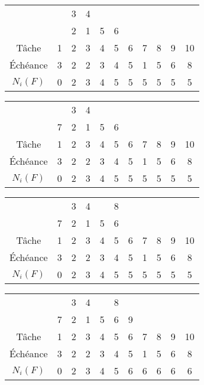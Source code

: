 \documentclass[11pt]{article}
\begin{document}
\begin{center}
\begin{tabular}{ |c| c c c c c c c c  c c |}
 \hline 
&  & 3 & {\color{magenta}4} & & & & & & & \\   
 & & 2 & 1 & 5 & 6& & & & & \\ 
Tâche & 1 & 2 & 3 & 4  & 5 & 6 & 7 & 8 & 9 & 10 \\ 
 \hline 
Échéance & 3 & 2 & 2 & 3  & 4 & 5 & 1 & 5 & 6 & 8  \\
 \hline
 $N_{i}(F)$ & 0 & 2 & 3 & 4 & 5 & 5 & 5 & 5 & 5 & 5 \\
 
  \hline 
\end{tabular}
\end{center}

\begin{center}
\begin{tabular}{ |c| c c c c c c c c  c c |}
 \hline 
&  & 3 & {\color{magenta}4} & & & & & & & \\   
 & {\color{magenta}7}& 2 & 1 & 5 & 6& & & & & \\ 
Tâche & 1 & 2 & 3 & 4  & 5 & 6 & 7 & 8 & 9 & 10 \\ 
 \hline 
Échéance & 3 & 2 & 2 & 3  & 4 & 5 & 1 & 5 & 6 & 8  \\
 \hline
 $N_{i}(F)$ & 0 & 2 & 3 & 4 & 5 & 5 & 5 & 5 & 5 & 5 \\
 
  \hline 
\end{tabular}
\end{center}

\begin{center}
\begin{tabular}{ |c| c c c c c c c c  c c |}
 \hline 
&  & 3 & {\color{magenta}4} & & {\color{magenta}8} & & & & & \\   
 & {\color{magenta}7}& 2 & 1 & 5 & 6& & & & & \\ 
Tâche & 1 & 2 & 3 & 4  & 5 & 6 & 7 & 8 & 9 & 10 \\ 
 \hline 
Échéance & 3 & 2 & 2 & 3  & 4 & 5 & 1 & 5 & 6 & 8  \\
 \hline
 $N_{i}(F)$ & 0 & 2 & 3 & 4 & 5 & 5 & 5 & 5 & 5 & 5 \\
 
  \hline 
\end{tabular}
\end{center}

\begin{center}
\begin{tabular}{ |c| c c c c c c c c  c c |}
 \hline 
&  & 3 & {\color{magenta}4} & & {\color{magenta}8} & & & & & \\   
 & {\color{magenta}7}& 2 & 1 & 5 & 6& 9 & & & & \\ 
Tâche & 1 & 2 & 3 & 4  & 5 & 6 & 7 & 8 & 9 & 10 \\ 
 \hline 
Échéance & 3 & 2 & 2 & 3  & 4 & 5 & 1 & 5 & 6 & 8  \\
 \hline
 $N_{i}(F)$ & 0 & 2 & 3 & 4 & 5 & 6 & 6 & 6 & 6 & 6 \\
 
  \hline 
\end{tabular}
\end{center}
\end{document}

